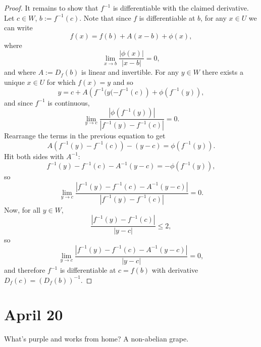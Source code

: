 \documentclass[12pt]{article}
\newcommand\inv[1]{#1^{-1}}
\newcommand{\paren}[1]{\left( #1 \right)}
\theoremstyle{definition}
\theoremstyle{remark}
\begin{document}
\begin{proof}
    It remains to show that $\inv{f}$ is differentiable with the claimed derivative. Let $c \in W$, $b := \inv{f}(c)$. Note that since $f$ is differentiable at $b$, for any $x \in U$ we can write
    \[
        f(x) = f(b) + A(x-b) + \phi(x),
    \]
    where 
    \[
        \lim\limits_{x \to b} \frac{|\phi(x)|}{|x - b|} = 0,
    \]
    and where $A := D_f(b)$ is linear and invertible. For any $y \in W$ there exists a unique $x \in U$ for which $f(x) = y$ and so 
    \[
        y = c + A \paren{ \inv{f}(y( - \inv{f}(c) } + \phi \paren{ \inv{f}(y) },
    \]
    and since $\inv{f}$ is continuous, 
    \[
        \lim\limits_{y \to c} \frac{ \left| \phi \paren{ \inv{f}(y) } \right| }{ \left| \inv{f}(y) - \inv{f}(c) \right| } = 0.
    \]
    Rearrange the terms in the previous equation to get
    \[
        A \paren{ \inv{f}(y) - \inv{f}(c) } - (y - c) = \phi \paren{ \inv{f}(y) }.
    \]
    Hit both sides with $\inv{A}$:
    \[
        \inv{f}(y) - \inv{f}(c) - \inv{A}(y - c) = -\phi \paren{ \inv{f}(y) },
    \]
    so 
    \[
        \lim\limits_{y \to c} \frac{ \left| \inv{f}(y) - \inv{f}(c) - \inv{A}(y - c) \right| }{ \left| \inv{f}(y) - \inv{f}(c) \right|} = 0.
    \]
    Now, for all $y \in W$, 
    \[
        \frac{ \left| \inv{f}(y) - \inv{f}(c) \right| }{\left| y - c \right|} \leq 2,
    \]
    so 
    \[
        \lim\limits_{y \to c} \frac{ \left| \inv{f}(y) - \inv{f}(c) - \inv{A}(y - c) \right| }{\left| y - c \right|} = 0,
    \]
    and therefore $\inv{f}$ is differentiable at $c = f(b)$ with derivative $D_f(c) = \inv{ \paren{ D_f(b) } }$.
\end{proof}
\section{April 20}
What's purple and works from home? A non-abelian grape.
\end{document}
